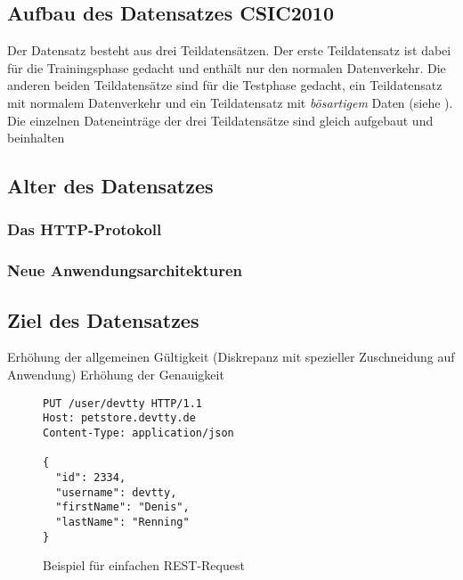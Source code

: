 %

\subsection{Aufbau des Datensatzes CSIC2010}


Der Datensatz besteht aus drei Teildatensätzen. Der erste Teildatensatz ist dabei für die Trainingsphase gedacht und enthält nur den normalen Datenverkehr. Die anderen beiden Teildatensätze sind für die Testphase gedacht, ein Teildatensatz mit normalem Datenverkehr und ein Teildatensatz mit \emph{bösartigem} Daten (siehe \cite{csic2010}). Die einzelnen Dateneinträge der drei Teildatensätze sind gleich aufgebaut und beinhalten



\subsection{Alter des Datensatzes}

\subsubsection{Das HTTP-Protokoll}

\subsubsection{Neue Anwendungsarchitekturen}

\subsection{Ziel des Datensatzes}

Erhöhung der allgemeinen Gültigkeit (Diskrepanz mit spezieller Zuschneidung auf Anwendung)
Erhöhung der Genauigkeit


      \begin{figure}
        \caption{Beispiel für einfachen REST-Request}
        \label{fig:restputexample}
      \begin{lstlisting}
PUT /user/devtty HTTP/1.1
Host: petstore.devtty.de
Content-Type: application/json

{
  "id": 2334,
  "username": devtty,
  "firstName": "Denis",
  "lastName": "Renning"
}
\end{lstlisting}
\end{figure}



